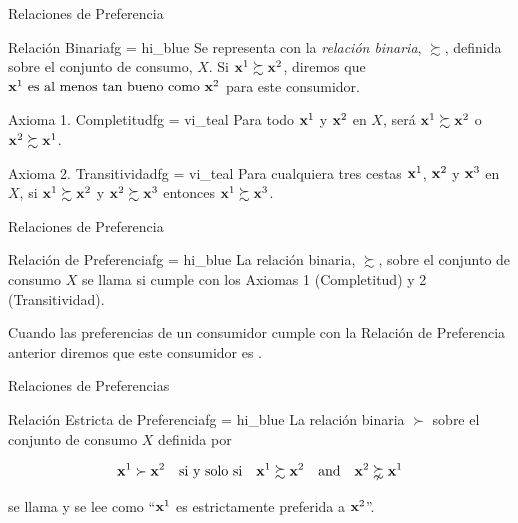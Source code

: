 \documentclass[10pt,aspectratio=169]{beamer}  %
\begin{document}
\begin{frame}{Relaciones de Preferencia}
	\begin{varblock}{Relación Binaria}{fg = hi_blue}
	  \vsf
    Se representa con la \textit{relación binaria}, $\succsim$, definida sobre el conjunto 
    de consumo, $X$. Si $\mathbf{x}^1 \succsim \mathbf{x}^2$, diremos que $\mathbf{x}^1 \text{ es al menos tan bueno como } \mathbf{x}^2$
    para este consumidor.
    \vsf
  \end{varblock}
  \vspace{10pt}\pause
  \begin{varblock}{Axioma 1. Completitud}{fg = vi_teal}
    \vsf
	    Para todo $\mathbf{x}^1$ y $\mathbf{x}^2$ en $X$, será $\mathbf{x}^1 \succsim \mathbf{x}^2$ o $\mathbf{x}^2 \succsim \mathbf{x}^1$. 
    \vsf
  \end{varblock}
  \vspace{10pt} \pause
  \begin{varblock}{Axioma 2. Transitividad}{fg = vi_teal}
    \vsf
	    Para cualquiera tres cestas $\mathbf{x}^1$, $\mathbf{x}^2$ y $\mathbf{x}^3$ en $X$, 
      si  $\mathbf{x}^1 \succsim \mathbf{x}^2$ y $\mathbf{x}^2 \succsim \mathbf{x}^3$ entonces $\mathbf{x}^1 \succsim \mathbf{x}^3$. 
    \vsf
  \end{varblock}

\end{frame}

\begin{frame}{Relaciones de Preferencia}
	\begin{varblock}{Relación de Preferencia}{fg = hi_blue}
	  \vsf
    La relación binaria, $\succsim$, sobre el conjunto de consumo $X$ se llama 
    si cumple con los Axiomas 1 (Completitud) y 2 (Transitividad).
    \vsf
  \end{varblock}
  \pause
  Cuando las preferencias de un consumidor cumple con la Relación de Preferencia anterior diremos que este consumidor
  es .

\end{frame}


\begin{frame}{Relaciones de Preferencias}
  \begin{varblock}{Relación Estricta de Preferencia}{fg = hi_blue}
    \vsf
    La relación binaria $\succ$ sobre el conjunto de consumo $X$ definida por
    
    \[ \mathbf{x}^1 \succ \mathbf{x}^2 \quad \text{si y solo si} \quad \mathbf{x}^1 \succsim \mathbf{x}^2 \quad \text{and} \quad \mathbf{x}^2 \succnsim  \mathbf{x}^1\]

    se llama  y se lee como ``$\mathbf{x}^1$ es estrictamente preferida a $\mathbf{x}^2$''.
    \vsf
  \end{varblock}

\end{frame}
\end{document}
